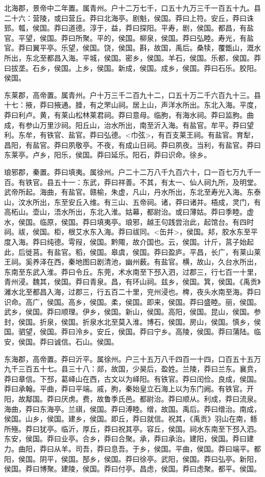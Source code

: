 \documentclass[]{article}
\begin{document}
北海郡，景帝中二年置。属青州。户十二万七千，口五十九万三千一百五十九。县二十六：营陵，或曰营丘。莽曰北海亭。剧魁，侯国。莽曰上符。安丘，莽曰诛郅。瓡，侯国。莽曰道德。淳于，益，莽曰探阳。平寿，剧，侯国。都昌，有盐官。平望，侯国。莽曰所聚。平的，侯国。柳泉，侯国。莽曰弘睦。寿光，有盐官。莽曰翼平亭。乐望，侯国。饶，侯国。斟，故国，禹后。桑犊，覆甑山，溉水所出，东北至都昌入海。平城，侯国。密乡，侯国。羊石，侯国。乐都，侯国。莽曰拔垄。石乡，侯国。上乡，侯国。新成，侯国。成乡，侯国。莽曰石乐。胶阳。侯国。

东莱郡，高帝置。属青州。户十万三千二百九十二，口五十万二千六百九十三。县十七：掖，莽曰掖通。腄，有之罘山祠。居上山，声洋水所出。东北入海。平度，莽曰利卢。黄，有莱山松林莱君祠。莽曰意母。临朐，有海水祠。莽曰监朐。曲成，有参山万里沙祠。阳丘山，治水所出，南至沂入海。有盐官。牟平。莽曰望利。东牟，有铁官、盐官。莽曰弘德。\textless{}巾弦\textgreater{}，有百支莱王祠。有盐官。育犁，昌阳，有盐官。莽曰夙敬亭。不夜，有成山日祠。莽曰夙夜。当利，有盐官。莽曰东莱亭。卢乡，阳乐，侯国。莽曰延乐。阳石，莽曰识命。徐乡。

琅邪郡，秦置。莽曰填夷。属徐州。户二十二万八千九百六十，口一百七万九千一百。有铁官。县五十一：东武，莽曰祥善。不其，有太一、仙人祠九所，及明堂。武帝所起。海曲，有盐官。赣榆，朱虚，凡山，丹水所出，东北至寿光入海。东泰山，汶水所出，东至安丘入维。有三山、五帝祠。诸，莽曰诸并。梧成，灵门，有高柘山。壶山，浯水所出，东北入淮。姑幕，都尉治。或曰薄姑。莽曰季睦。虚水，侯国。临原，侯国。莽曰填夷亭。琅邪，越王句践尝治此，起馆台。有四时祠。祓，侯国。柜，根艾水东入海。莽曰祓同。\textless{}缶并\textgreater{}，侯国。邞，胶水东至平度入海。莽曰纯德。雩叚，侯国。黔陬，故介国也。云，侯国。计斤，莒子始起此，后徙莒。有盐官。稻，侯国。皋虞，侯国。莽曰盈庐。平昌，长广，有莱山莱王祠。奚养泽在西，秦地图曰剧清池，幽州薮。有盐官。横，故山，久台水所出，东南至东武入淮。莽曰令丘。东莞，术水南至下邳入泗，过郡三，行七百一十里，青州浸。魏其，侯国。莽曰青泉。昌，有环山祠。兹乡，侯国。箕，侯国。《禹贡》濰水北至都昌入海，过郡三，行五百二十里，兖州浸也。椑，夜头水南至海。莽曰识命。高广，侯国。高乡，侯国。柔，侯国。即来，侯国。莽曰盛睦。丽，侯国。武乡，侯国。莽曰顺理。伊乡，侯国。新山，侯国。高阳，侯国。昆山，侯国。参封，侯国。折泉，侯国。折泉水北至莫入淮。博石，侯国。房山，侯国。慎乡，侯国。驷望，侯国。莽曰泠乡。安丘，侯国。莽曰宁乡。高陵，侯国。莽曰蒲陆。临安，侯国。莽曰诚信。石山。侯国。

东海郡，高帝置。莽曰沂平。属徐州。户三十五万八千四百一十四，口百五十五万九千三百五十七。县三十八：郯，故国，少昊后，盈姓。兰陵，莽曰兰东。襄贲，莽曰章信。下邳，葛峄山在西，古文以为峄阳。有铁官。莽曰闰俭。良成，侯国。莽曰承翰。平曲，莽曰平端。戚，朐，秦始皇立石海上以为东门阙。有铁官。开阳，故鄅国。莽曰厌虏。费，故鲁季氏邑。都尉治。莽曰顺从。利成，莽曰流泉。海曲，莽曰东海亭。兰祺，侯国。莽曰溥睦。缯，故国。禹后。莽曰缯治。南成，侯国。山乡，侯国。建乡，侯国。即丘，莽曰就信。祝其，《禹贡》羽山在南，鲧所殛。莽曰犹亭。临沂，厚丘，莽曰祝其亭。容丘，侯国。祠水东南至下邳入泗。东安，侯国。莽曰业亭。合乡，莽曰合聚。承，莽曰承治。建阳，侯国。莽曰建力。曲阳，莽曰从羊。司吾，莽曰息吾。于乡，侯国。平曲，侯国。莽曰端平。都阳，侯国。阴平，侯国。郚乡，侯国。莽曰徐亭。武阳，侯国。莽曰弘亭。新阳，侯国。莽曰博聚。建陵，侯国。莽曰付亭。昌虑，侯国。莽曰虑聚。都平。侯国。
\end{document}
